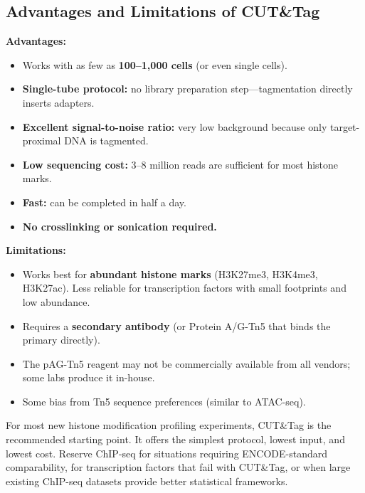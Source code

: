 \subsection{Advantages and Limitations of CUT\&Tag}
\label{subsec:histones:cuttag-advantages}

\textbf{Advantages:}
\begin{itemize}[itemsep=2pt]
  \item Works with as few as \textbf{100--1,000 cells} (or even single cells).
  \item \textbf{Single-tube protocol:} no library preparation step---tagmentation directly inserts adapters.
  \item \textbf{Excellent signal-to-noise ratio:} very low background because only target-proximal DNA is tagmented.
  \item \textbf{Low sequencing cost:} 3--8 million reads are sufficient for most histone marks.
  \item \textbf{Fast:} can be completed in half a day.
  \item \textbf{No crosslinking or sonication required.}
\end{itemize}

\textbf{Limitations:}
\begin{itemize}[itemsep=2pt]
  \item Works best for \textbf{abundant histone marks} (H3K27me3, H3K4me3, H3K27ac). Less reliable for transcription factors with small footprints and low abundance.
  \item Requires a \textbf{secondary antibody} (or Protein A/G-Tn5 that binds the primary directly).
  \item The pAG-Tn5 reagent may not be commercially available from all vendors; some labs produce it in-house.
  \item Some bias from Tn5 sequence preferences (similar to ATAC-seq).
\end{itemize}

\begin{tipbox}
For most new histone modification profiling experiments, CUT\&Tag is the recommended starting point. It offers the simplest protocol, lowest input, and lowest cost. Reserve ChIP-seq for situations requiring ENCODE-standard comparability, for transcription factors that fail with CUT\&Tag, or when large existing ChIP-seq datasets provide better statistical frameworks.
\end{tipbox}

